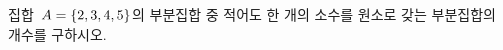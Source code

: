 집합~$A=\{2{,}\mkern3mu\mathopen{}3{,}\mkern3mu\mathopen{}4{,}\mkern3mu\mathopen{}5\}$의 부분집합 중 적어도 한 개의 소수를 원소로 갖는 부분집합의 개수를 구하시오.

